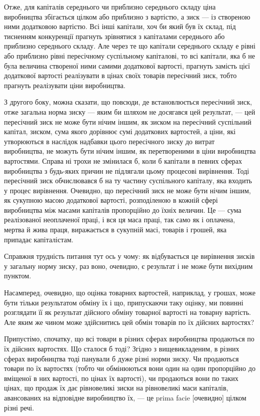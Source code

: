 Отже, для капіталів середнього чи приблизно середнього
складу ціна виробництва збігається цілком або приблизно з вартістю,
а зиск — із створеною ними додатковою вартістю. Всі інші
капітали, хоч би який був їх склад, під тисненням конкуренції
прагнуть зрівнятися з капіталами середнього або приблизно
середнього складу. Але через те що капітали середнього складу
е рівні або приблизно рівні пересічному суспільному капіталові,
то всі капітали, яка б не була величина створеної ними самими
додаткової вартості, прагнуть замість цієї додаткової вартості
реалізувати в цінах своїх товарів пересічний зиск, тобто прагнуть реалізувати ціни виробництва.

З другого боку, можна сказати, що повсюди, де встановлюється пересічний зиск, отже загальна норма
зиску — яким би
шляхом не досягався цей результат, — цей пересічний зиск не
може бути нічим іншим, як зиском на пересічний суспільний
капітал, зиском, сума якого дорівнює сумі додаткових вартостей,
а ціни, які утворюються в наслідок надбавки цього пересічного
зиску до витрат виробництва, не можуть бути нічим іншим, як
перетвореними в ціни виробництва вартостями. Справа ні трохи
не змінилася б, коли б капітали в певних сферах виробництва
з будь-яких причин не підлягали цьому процесові вирівнення.
Тоді пересічний зиск обчислювався б на ту частину суспільного
капіталу, яка входить у процес вирівнення. Очевидно, що пересічний зиск не може бути нічим іншим, як
сукупною масою
додаткової вартості, розподіленою в кожній сфері виробництва
між масами капіталів пропорційно до їхніх величин. Це — сума
реалізованої неоплаченої праці, і вся ця маса праці, так само як
і оплачена, мертва й жива праця, виражається в сукупній масі,
товарів і грошей, яка припадає капіталістам.

Справжня трудність питання тут ось у чому: як відбувається
це вирівнення зисків у загальну норму зиску, раз воно, очевидно, є результат і не може бути вихідним
пунктом.

Насамперед, очевидно, що оцінка товарних вартостей, наприклад, у грошах, може бути тільки
результатом обміну їх і що,
припускаючи таку оцінку, ми повинні розглядати її як результат
дійсного обміну товарної вартості на товарну вартість. Але
яким же чином може здійснитись цей обмін товарів по їх дійсних вартостях?

Припустімо, спочатку, що всі товари в різних сферах виробництва продаються по їх дійсних вартостях.
Що сталося б
тоді? Згідно з вищевикладеним, в різних сферах виробництва
тоді панували б дуже різні норми зиску. Чи продаються товари
по їх вартостях (тобто чи обмінюються вони один на один пропорційно до вміщеної в них вартості, по
цінах їх вартості),
чи продаються вони по таких цінах, що продаж їх дає рівновеликі зиски на рівновеликі маси капіталів,
авансованих на відповідне виробництво їх, — це prima facie [очевидно] цілком різні речі.

